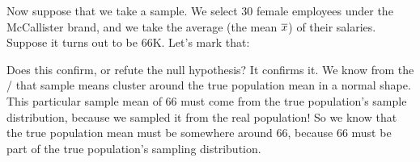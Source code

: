 \documentclass[../../../main.tex]{subfiles}
\begin{document}
\begin{center}
\end{center}

\noindent
Now suppose that we take a sample. We select 30 female employees under the McCallister brand, and we take the average (the mean $\overline{x}$) of their salaries. Suppose it turns out to be 66K. Let's mark that:

\begin{center}
\end{center}

\noindent
Does this confirm, or refute the null hypothesis? It confirms it. We know from the \CLT/ that sample means cluster around the true population mean in a normal shape. This particular sample mean of 66 must come from the true population's sample distribution, because we sampled it from the real population! So we know that the true population mean must be somewhere around 66, because 66 must be part of the true population's sampling distribution. 
\end{document}
